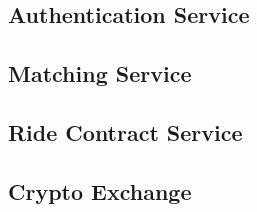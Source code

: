 \subsection{Authentication Service}

\subsection{Matching Service}

\subsection{Ride Contract Service}

\subsection{Crypto Exchange}
